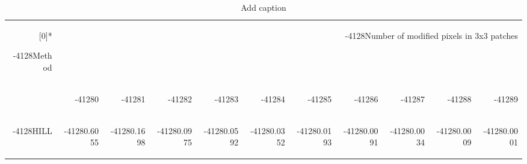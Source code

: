 \begin{table}[htbp]
  \centering
  \caption{Add caption}
    \begin{tabular}{rrrrrrrrrrr}
    \rowcolor[rgb]{ 0,  0,  0} \multirow{2}[0]{*}{\begin{turn}{-4128}Method\end{turn}} & \multicolumn{10}{r}{\begin{turn}{-4128}Number of modified pixels in 3x3 patches\end{turn}} \\
    \rowcolor[rgb]{ 0,  0,  0}       & \begin{turn}{-4128}0\end{turn} & \begin{turn}{-4128}1\end{turn} & \begin{turn}{-4128}2\end{turn} & \begin{turn}{-4128}3\end{turn} & \begin{turn}{-4128}4\end{turn} & \begin{turn}{-4128}5\end{turn} & \begin{turn}{-4128}6\end{turn} & \begin{turn}{-4128}7\end{turn} & \begin{turn}{-4128}8\end{turn} & \begin{turn}{-4128}9\end{turn} \\
    \rowcolor[rgb]{ 0,  0,  0} \begin{turn}{-4128}HILL\end{turn} & \begin{turn}{-4128}0.6055 \end{turn} & \begin{turn}{-4128}0.1698 \end{turn} & \begin{turn}{-4128}0.0975 \end{turn} & \begin{turn}{-4128}0.0592 \end{turn} & \begin{turn}{-4128}0.0352 \end{turn} & \begin{turn}{-4128}0.0193 \end{turn} & \begin{turn}{-4128}0.0091 \end{turn} & \begin{turn}{-4128}0.0034 \end{turn} & \begin{turn}{-4128}0.0009 \end{turn} & \begin{turn}{-4128}0.0001 \end{turn} \\

\end{tabular}
\end{table}
